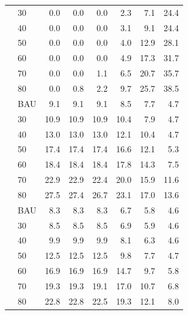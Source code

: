 \documentclass[]{article}
\begin{document}
\begin{longtable}{>{\raggedright\arraybackslash}p{2 cm}lrrrrrr}
\rowcolor{gray!6}   & 30 & 0.0 & 0.0 & 0.0 & 2.3 & 7.1 & 24.4\\

 & 40 & 0.0 & 0.0 & 0.0 & 3.1 & 9.1 & 24.4\\

\rowcolor{gray!6}   & 50 & 0.0 & 0.0 & 0.0 & 4.0 & 12.9 & 28.1\\

 & 60 & 0.0 & 0.0 & 0.0 & 4.9 & 17.3 & 31.7\\

\rowcolor{gray!6}   & 70 & 0.0 & 0.0 & 1.1 & 6.5 & 20.7 & 35.7\\

\multirow{-7}{2 cm}{\raggedright\arraybackslash Offshore Wind} & 80 & 0.0 & 0.8 & 2.2 & 9.7 & 25.7 & 38.5\\
\cmidrule{1-8}
\rowcolor{gray!6}   & BAU & 9.1 & 9.1 & 9.1 & 8.5 & 7.7 & 4.7\\

 & 30 & 10.9 & 10.9 & 10.9 & 10.4 & 7.9 & 4.7\\

\rowcolor{gray!6}   & 40 & 13.0 & 13.0 & 13.0 & 12.1 & 10.4 & 4.7\\

 & 50 & 17.4 & 17.4 & 17.4 & 16.6 & 12.1 & 5.3\\

\rowcolor{gray!6}   & 60 & 18.4 & 18.4 & 18.4 & 17.8 & 14.3 & 7.5\\

 & 70 & 22.9 & 22.9 & 22.4 & 20.0 & 15.9 & 11.6\\

\rowcolor{gray!6}  \multirow{-7}{2 cm}{\raggedright\arraybackslash Solar} & 80 & 27.5 & 27.4 & 26.7 & 23.1 & 17.0 & 13.6\\
\cmidrule{1-8}
 & BAU & 8.3 & 8.3 & 8.3 & 6.7 & 5.8 & 4.6\\

\rowcolor{gray!6}   & 30 & 8.5 & 8.5 & 8.5 & 6.9 & 5.9 & 4.6\\

 & 40 & 9.9 & 9.9 & 9.9 & 8.1 & 6.3 & 4.6\\

\rowcolor{gray!6}   & 50 & 12.5 & 12.5 & 12.5 & 9.8 & 7.7 & 4.7\\

 & 60 & 16.9 & 16.9 & 16.9 & 14.7 & 9.7 & 5.8\\

\rowcolor{gray!6}   & 70 & 19.3 & 19.3 & 19.1 & 17.0 & 10.7 & 6.8\\

\multirow{-7}{2 cm}{\raggedright\arraybackslash Terrestrial Wind} & 80 & 22.8 & 22.8 & 22.5 & 19.3 & 12.1 & 8.0\\
\bottomrule
\end{longtable}
\end{document}
